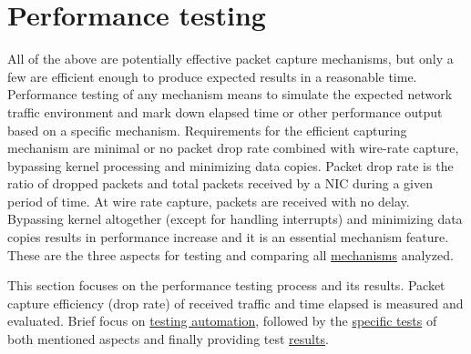 \documentclass[12pt,a4paper,twoside]{book}
\begin{document}
    \section{Performance testing} \label{analysis:testing}
        All of the above are potentially effective packet capture mechanisms, but only a few are efficient enough to produce expected results in a reasonable time. Performance testing of any mechanism means to simulate the expected network traffic environment and mark down elapsed time or other performance output based on a specific mechanism. Requirements for the efficient capturing mechanism are minimal or no packet drop rate combined with wire-rate capture, bypassing kernel processing and minimizing data copies. Packet drop rate is the ratio of dropped packets and total packets received by a NIC during a given period of time. At wire rate capture, packets are received with no delay. Bypassing kernel altogether (except for handling interrupts) and minimizing data copies results in performance increase and it is an essential mechanism feature. These are the three aspects for testing and comparing all \hyperref[analysis:mechs]{mechanisms} analyzed.\par
        This section focuses on the performance testing process and its results. Packet capture efficiency (drop rate) of received traffic and time elapsed is measured and evaluated. Brief focus on \hyperref[analysis:testing:auto]{testing automation}, followed by the \hyperref[analysis:testing:tests]{specific tests} of both mentioned aspects and finally providing test \hyperref[analysis:testing:results]{results}.
\end{document}
